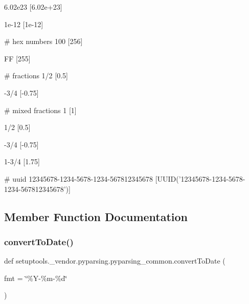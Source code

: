 \begin{DoxyVerb}
    6.02e23
    [6.02e+23]

    1e-12
    [1e-12]

    # hex numbers
    100
    [256]

    FF
    [255]

    # fractions
    1/2
    [0.5]

    -3/4
    [-0.75]

    # mixed fractions
    1
    [1]

    1/2
    [0.5]

    -3/4
    [-0.75]

    1-3/4
    [1.75]

    # uuid
    12345678-1234-5678-1234-567812345678
    [UUID('12345678-1234-5678-1234-567812345678')]
\end{DoxyVerb}
 

\subsection{Member Function Documentation}
\mbox{\label{classsetuptools_1_1__vendor_1_1pyparsing_1_1pyparsing__common_a0ee473afab253b7d8c130f5bf2164b49}} 
\subsubsection{\texorpdfstring{convert\+To\+Date()}{convertToDate()}}
{\footnotesize\ttfamily def setuptools.\+\_\+vendor.\+pyparsing.\+pyparsing\+\_\+common.\+convert\+To\+Date (\begin{DoxyParamCaption}\item[{}]{fmt = {\ttfamily \char`\"{}\%Y-\/\%m-\/\%d\char`\"{}} }\end{DoxyParamCaption})\hspace{0.3cm}{\ttfamily [static]}}

